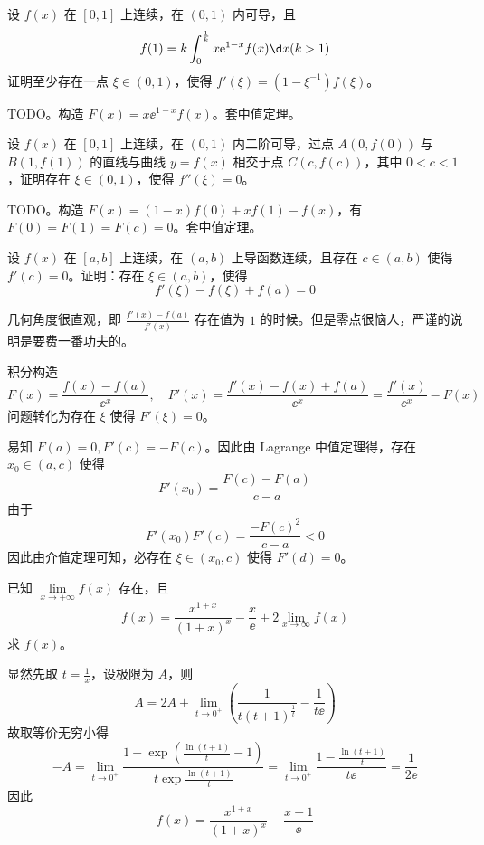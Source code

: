\begin{problem}[000012]
设 $f(x)$ 在 $[0, 1]$ 上连续，在 $(0, 1)$ 内可导，且
\[ f(1) = k \int_{0}^{\frac{1}{k}} x \ee^{1-x} f(x) \d x (k > 1) \]
证明至少存在一点 $\xi \in (0, 1)$，使得 $f'(\xi) = (1 - \xi^{-1})f(\xi)$。
\end{problem}

\begin{solution}
	TODO。构造 $F(x) = x \ee^{1-x} f(x)$。套中值定理。
\end{solution}

\begin{problem}[000013]
设 $f(x)$ 在 $[0, 1]$ 上连续，在 $(0, 1)$ 内二阶可导，过点 $A(0, f(0))$ 与 $B(1, f(1))$ 的直线与曲线 $y=f(x)$ 相交于点 $C(c, f(c))$，其中 $0 < c < 1$，证明存在 $\xi \in (0, 1)$，使得 $f''(\xi) = 0$。
\end{problem}

\begin{solution}
	TODO。构造 $F(x) = (1-x)f(0) + xf(1) - f(x)$，有 $F(0) = F(1) = F(c) = 0$。套中值定理。
\end{solution}

\begin{problem}[000016]
设 $f(x)$ 在 $[a, b]$ 上连续，在 $(a, b)$ 上导函数连续，且存在 $c \in (a, b)$ 使得 $f'(c) = 0$。证明：存在 $\xi \in (a, b)$，使得
\[ f'(\xi) - f(\xi) + f(a) = 0 \]
\end{problem}

\begin{solution}
	几何角度很直观，即 $\frac{f'(x) - f(a)}{f'(x)}$ 存在值为 $1$ 的时候。但是零点很恼人，严谨的说明是要费一番功夫的。

	积分构造
	\[ F(x) = \frac{f(x) - f(a)}{\ee^x}, \quad F'(x) = \frac{f'(x) - f(x) + f(a)}{\ee^x} = \frac{f'(x)}{\ee^x} - F(x) \]
	问题转化为存在 $\xi$ 使得 $F'(\xi) = 0$。

	易知 $F(a) = 0, F'(c) = -F(c)$。因此由 Lagrange 中值定理得，存在 $x_0 \in (a, c)$ 使得
	\[ F'(x_0) = \frac{F(c) - F(a)}{c - a} \]
	由于
	\[ F'(x_0) F'(c) = \frac{-F(c)^2}{c- a} < 0 \]
	因此由介值定理可知，必存在 $\xi \in (x_0, c)$ 使得 $F'(d) = 0$。
\end{solution}

\begin{problem}[000017]
已知 $\lim\limits_{x \to +\infty} f(x)$ 存在，且
\[ f(x) = \frac{x^{1+x}}{(1+x)^x} - \frac{x}{\ee} + 2 \lim_{x \to \infty} f(x) \]
求 $f(x)$。
\end{problem}

\begin{solution}
	显然先取 $t = \frac{1}{x}$，设极限为 $A$，则
	\[ A = 2A + \lim_{t \to 0^+} \left( \frac{1}{t (t+1)^{\frac{1}{t}}} - \frac{1}{t \ee} \right) \]
	故取等价无穷小得
	\[ -A = \lim_{t \to 0^+} \frac{1 - \exp\left( \frac{\ln(t + 1)}{t} - 1\right)}{t \exp\frac{\ln(t + 1)}{t}} = \lim_{t \to 0^+} \frac{1 - \frac{\ln(t + 1)}{t}}{t \ee} = \frac{1}{2 \ee} \]
	因此
	\[ f(x) = \frac{x^{1+x}}{(1+x)^x} - \frac{x + 1}{\ee} \]
\end{solution}

